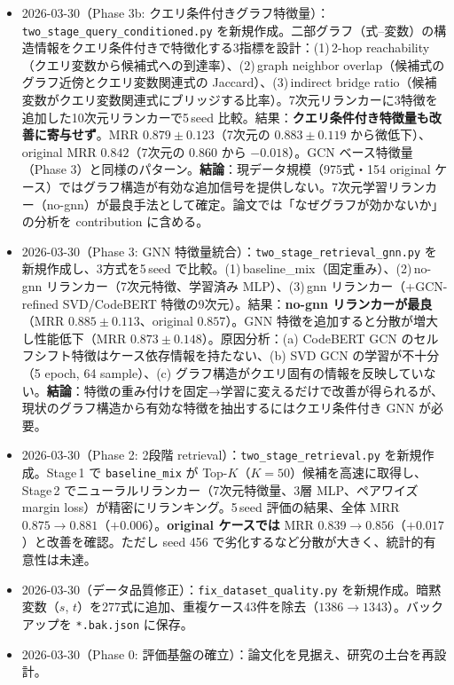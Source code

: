 \documentclass[11pt,a4paper]{jsarticle}
\begin{document}
\begin{itemize}[nosep]
  \item 2026-03-30（Phase 3b: クエリ条件付きグラフ特徴量）：\texttt{two\_stage\_query\_conditioned.py} を新規作成。二部グラフ（式--変数）の構造情報をクエリ条件付きで特徴化する3指標を設計：(1)\,2-hop reachability（クエリ変数から候補式への到達率）、(2)\,graph neighbor overlap（候補式のグラフ近傍とクエリ変数関連式の Jaccard）、(3)\,indirect bridge ratio（候補変数がクエリ変数関連式にブリッジする比率）。7次元リランカーに3特徴を追加した10次元リランカーで5\,seed 比較。結果：\textbf{クエリ条件付き特徴量も改善に寄与せず}。MRR $0.879 \pm 0.123$（7次元の $0.883 \pm 0.119$ から微低下）、original MRR $0.842$（7次元の $0.860$ から $-0.018$）。GCN ベース特徴量（Phase 3）と同様のパターン。\textbf{結論}：現データ規模（975式・154 original ケース）ではグラフ構造が有効な追加信号を提供しない。7次元学習リランカー（no-gnn）が最良手法として確定。論文では「なぜグラフが効かないか」の分析を contribution に含める。
  \item 2026-03-30（Phase 3: GNN 特徴量統合）：\texttt{two\_stage\_retrieval\_gnn.py} を新規作成し、3方式を5\,seed で比較。(1)\,baseline\_mix（固定重み）、(2)\,no-gnn リランカー（7次元特徴、学習済み MLP）、(3)\,gnn リランカー（+GCN-refined SVD/CodeBERT 特徴の9次元）。結果：\textbf{no-gnn リランカーが最良}（MRR $0.885 \pm 0.113$、original $0.857$）。GNN 特徴を追加すると分散が増大し性能低下（MRR $0.873 \pm 0.148$）。原因分析：(a) CodeBERT GCN のセルフシフト特徴はケース依存情報を持たない、(b) SVD GCN の学習が不十分（5 epoch, 64 sample）、(c) グラフ構造がクエリ固有の情報を反映していない。\textbf{結論}：特徴の重み付けを固定→学習に変えるだけで改善が得られるが、現状のグラフ構造から有効な特徴を抽出するにはクエリ条件付き GNN が必要。
  \item 2026-03-30（Phase 2: 2段階 retrieval）：\texttt{two\_stage\_retrieval.py} を新規作成。Stage\,1 で \texttt{baseline\_mix} が Top-$K$（$K\!=\!50$）候補を高速に取得し、Stage\,2 でニューラルリランカー（7次元特徴量、3層 MLP、ペアワイズ margin loss）が精密にリランキング。5\,seed 評価の結果、全体 MRR $0.875 \to 0.881$（$+0.006$）。\textbf{original ケースでは} MRR $0.839 \to 0.856$（$+0.017$）と改善を確認。ただし seed 456 で劣化するなど分散が大きく、統計的有意性は未達。
  \item 2026-03-30（データ品質修正）：\texttt{fix\_dataset\_quality.py} を新規作成。暗黙変数（$s$, $t$）を277式に追加、重複ケース43件を除去（$1386 \to 1343$）。バックアップを \texttt{*.bak.json} に保存。
  \item 2026-03-30（Phase 0: 評価基盤の確立）：論文化を見据え、研究の土台を再設計。
    \begin{itemize}[nosep]

\end{itemize}
\end{itemize}
\end{document}
